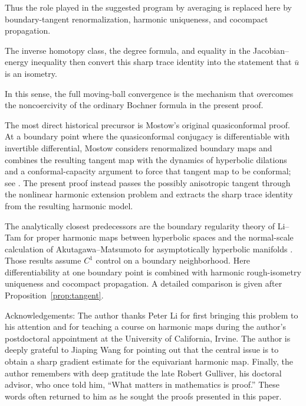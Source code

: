 \documentclass[11pt]{amsart}
\theoremstyle{plain}
\theoremstyle{plain}
\theoremstyle{plain}
\numberwithin{equation}{section}
\begin{document}
Thus the role played in the suggested program by averaging is replaced
here by boundary-tangent renormalization, harmonic uniqueness, and
cocompact propagation.

The inverse homotopy class, the degree formula, and equality in the
Jacobian--energy inequality then convert this sharp trace identity into
the statement that \(\bar u\) is an isometry. 

In this sense, the full moving-ball convergence is the mechanism that overcomes the
noncoercivity of the ordinary Bochner formula in the present proof.

The most direct historical precursor is Mostow's original
quasiconformal proof.  At a boundary point where the quasiconformal
conjugacy is differentiable with invertible differential, Mostow considers
renormalized boundary maps and combines the resulting tangent map with the
dynamics of hyperbolic dilations and a conformal-capacity argument to force
that tangent map to be conformal; see
\cite[pp.~99--101]{Mostow1968}.  The present proof instead passes the
possibly anisotropic tangent through the nonlinear harmonic extension
problem and extracts the sharp trace identity from the resulting harmonic
model.

The analytically closest predecessors are the boundary regularity theory of
Li--Tam for proper harmonic maps between hyperbolic spaces
\cite{LiTam,LiTamII} and the normal-scale calculation of
Akutagawa--Matsumoto for asymptotically hyperbolic manifolds
\cite[Lemma~1.3 and Corollary~1.4]{AkutagawaMatsumoto}.  Those results assume
\(C^1\) control on a boundary neighborhood.  Here differentiability at one
boundary point is combined with harmonic rough-isometry uniqueness and
cocompact propagation.  A detailed comparison is given after
Proposition~\ref{prop:tangent}.



Acknowledgements: The author thanks Peter Li for first bringing this problem to his
attention and for teaching a course on harmonic maps during the author's
postdoctoral appointment at the University of California, Irvine.  The
author is deeply grateful to Jiaping Wang for pointing out that the
central issue is to obtain a sharp gradient estimate for the equivariant
harmonic map.  Finally, the author remembers with deep gratitude the late
Robert Gulliver, his doctoral advisor, who once told him, ``What matters
in mathematics is proof.''  These words often returned to him as he
sought the proofs presented in this paper.


\end{document}
